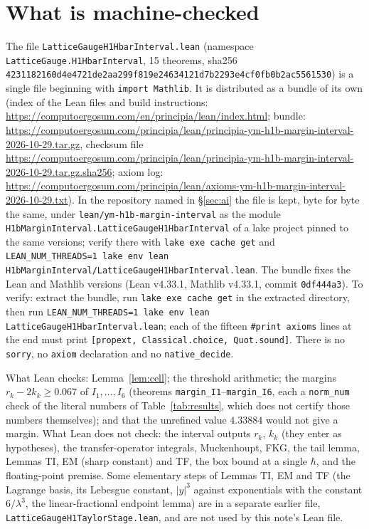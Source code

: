 \documentclass[11pt,a4paper]{article}
\theoremstyle{definition}
\theoremstyle{remark}
\begin{document}
\section{What is machine-checked}\label{sec:lean}

{\raggedright The file \texttt{LatticeGaugeH1HbarInterval.lean} (namespace \texttt{LatticeGauge.H1HbarInterval}, 15 theorems, sha256 \texttt{42311821\allowbreak{}60d4e472\allowbreak{}1de2aa29\allowbreak{}9f819e24\allowbreak{}634121d7\allowbreak{}b2293e4c\allowbreak{}f0fb0b2a\allowbreak{}c5561530}) is a single file beginning with \texttt{import Mathlib}. It is distributed as a bundle of its own (index of the Lean files and build instructions: \url{https://computoergosum.com/en/principia/lean/index.html}; bundle: \url{https://computoergosum.com/principia/lean/principia-ym-h1b-margin-interval-2026-10-29.tar.gz}, checksum file \url{https://computoergosum.com/principia/lean/principia-ym-h1b-margin-interval-2026-10-29.tar.gz.sha256}; axiom log: \url{https://computoergosum.com/principia/lean/axioms-ym-h1b-margin-interval-2026-10-29.txt}). In the repository named in \S\ref{sec:ai} the file is kept, byte for byte the same, under \texttt{lean/\allowbreak{}ym-h1b-margin-interval} as the module \texttt{H1bMarginInterval.\allowbreak{}LatticeGaugeH1HbarInterval} of a lake project pinned to the same versions; verify there with \texttt{lake exe cache get} and \texttt{LEAN\_NUM\_THREADS=1 lake env lean H1bMarginInterval/\allowbreak{}LatticeGaugeH1HbarInterval.lean}. The bundle fixes the Lean and Mathlib versions (Lean v4.33.1, Mathlib v4.33.1, commit \texttt{0df444a3}). To verify: extract the bundle, run \texttt{lake exe cache get} in the extracted directory, then run \texttt{LEAN\_NUM\_THREADS=1 lake env lean LatticeGaugeH1HbarInterval.lean}; each of the fifteen \texttt{\#print axioms} lines at the end must print \texttt{[propext, Classical.choice, Quot.sound]}. There is no \texttt{sorry}, no \texttt{axiom} declaration and no \texttt{native\_decide}.\par}

What Lean checks: Lemma~\ref{lem:cell}; the threshold arithmetic; the margins $r_k-2k_k\ge0.067$ of $I_1,\dots,I_6$ (theorems \texttt{margin\_I1}--\texttt{margin\_I6}, each a \texttt{norm\_num} check of the literal numbers of Table~\ref{tab:results}, which does not certify those numbers themselves); and that the unrefined value $4.33884$ would not give a margin. What Lean does not check: the interval outputs $r_k$, $k_k$ (they enter as hypotheses), the transfer-operator integrals, Muckenhoupt, FKG, the tail lemma, Lemmas TI, EM (sharp constant) and TF, the box bound at a single $\hbar$, and the floating-point premise. Some elementary steps of Lemmas TI, EM and TF (the Lagrange basis, its Lebesgue constant, $|y|^3$ against exponentials with the constant $6/\lambda^3$, the linear-fractional endpoint lemma) are in a separate earlier file, \texttt{LatticeGaugeH1TaylorStage.lean}, and are not used by this note's Lean file.
\end{document}
